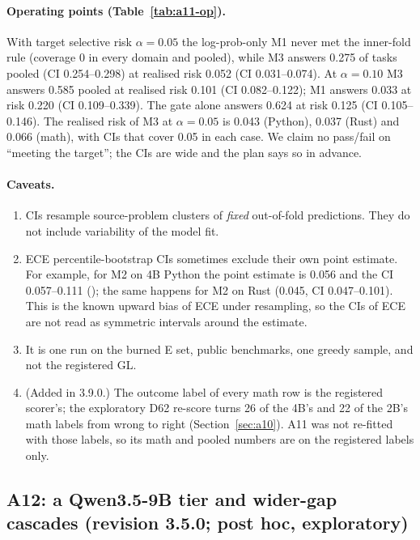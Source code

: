 \documentclass[11pt,a4paper]{article}
\newcommand{\code}[1]{\texttt{\detokenize{#1}}}
\begin{document}
\paragraph{Operating points (Table~\ref{tab:a11-op}).} With target selective risk $\alpha=0.05$ the log-prob-only M1 never
met the inner-fold rule (coverage 0 in every domain and pooled), while M3 answers 0.275 of tasks pooled (CI 0.254--0.298)
at realised risk 0.052 (CI 0.031--0.074). At $\alpha=0.10$ M3 answers 0.585 pooled at realised risk 0.101 (CI 0.082--0.122);
M1 answers 0.033 at risk 0.220 (CI 0.109--0.339). The gate alone answers 0.624 at risk 0.125 (CI 0.105--0.146). The realised
risk of M3 at $\alpha=0.05$ is 0.043 (Python), 0.037 (Rust) and 0.066 (math), with CIs that cover 0.05 in each case. We
claim no pass/fail on ``meeting the target''; the CIs are wide and the plan says so in advance.

\paragraph{Caveats.}
\begin{enumerate}
\item CIs resample source-problem clusters of \emph{fixed} out-of-fold predictions. They do not include variability of the
  model fit.
\item ECE percentile-bootstrap CIs sometimes exclude their own point estimate. For example, for M2 on 4B Python the point
  estimate is 0.056 and the CI 0.057--0.111 (\code{disc.ece.M2.python}); the same happens for M2 on Rust (0.045, CI
  0.047--0.101). This is the known upward bias of ECE under resampling, so the CIs of ECE are not read as symmetric
  intervals around the estimate.
\item It is one run on the burned E set, public benchmarks, one greedy sample, and not the registered GL.
\item (Added in 3.9.0.) The outcome label of every math row is the registered scorer's; the exploratory D62 re-score turns 26 of the 4B's and 22 of the 2B's math labels from wrong to right (Section~\ref{sec:a10}). A11 was not re-fitted with those labels, so its math and pooled numbers are on the registered labels only.
\end{enumerate}

{}

\subsection{A12: a Qwen3.5-9B tier and wider-gap cascades (revision 3.5.0; post hoc, exploratory)}\label{sec:a12}
\end{document}
